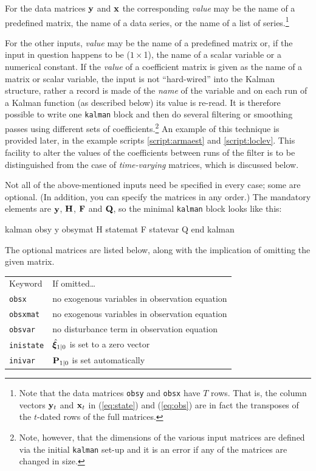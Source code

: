 For the data matrices $\mathbf{y}$ and $\mathbf{x}$ the corresponding
\textsl{value} may be the name of a predefined matrix, the name of a
data series, or the name of a list of series.\footnote{Note that the
  data matrices \texttt{obsy} and \texttt{obsx} have $T$ rows.  That
  is, the column vectors $\mathbf{y}_t$ and $\mathbf{x}_t$ in (\ref{eq:state})
  and (\ref{eq:obs}) are in fact the transposes of the $t$-dated rows
  of the full matrices.}  

For the other inputs, \textsl{value} may be the name of a predefined
matrix or, if the input in question happens to be ($1 \times $1), the
name of a scalar variable or a numerical constant.  If the
\textsl{value} of a coefficient matrix is given as the name of a
matrix or scalar variable, the input is not ``hard-wired'' into the
Kalman structure, rather a record is made of the \textit{name} of the
variable and on each run of a Kalman function (as described below) its
value is re-read.  It is therefore possible to write one
\texttt{kalman} block and then do several filtering or smoothing
passes using different sets of coefficients.\footnote{Note, however,
  that the dimensions of the various input matrices are defined via
  the initial \texttt{kalman} set-up and it is an error if any of the
  matrices are changed in size.}  An example of this technique is
provided later, in the example scripts \ref{script:armaest} and
\ref{script:loclev}.  This facility to alter the values of the
coefficients between runs of the filter is to be distinguished from
the case of \emph{time-varying} matrices, which is discussed below.

Not all of the above-mentioned inputs need be specified in every case;
some are optional. (In addition, you can specify the matrices in any
order.)  The mandatory elements are $\mathbf{y}$, $\mathbf{H}$, $\mathbf{F}$
and $\mathbf{Q}$, so the minimal \texttt{kalman} block looks like this:

\begin{code}
kalman 
  obsy y
  obsymat H
  statemat F
  statevar Q
end kalman
\end{code} 

The optional matrices are listed below, along with the implication
of omitting the given matrix.

\begin{center}
\begin{tabular}{ll}
Keyword & If omitted\dots \\ [6pt]
\texttt{obsx} & no exogenous variables in observation equation\\
\texttt{obsxmat} & no exogenous variables in observation equation\\
\texttt{obsvar} & no disturbance term in observation equation\\
\texttt{inistate} & $\hat{\bm{\xi}}_{1|0}$ is set to a zero vector\\
\texttt{inivar} & $\mathbf{P}_{1|0}$ is set automatically\\
\end{tabular}
\end{center}

